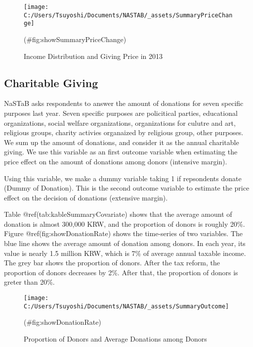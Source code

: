 \documentclass[
]{article}
\begin{document}
\begin{figure}[t]

{\centering \texttt{[image: C:/Users/Tsuyoshi/Documents/NASTAB/\_assets/SummaryPriceChange]} 

}

\caption{Income Distribution and Giving Price in 2013}(\#fig:showSummaryPriceChange)
\end{figure}

\hypertarget{charitable-giving}{%
\subsection{Charitable Giving}\label{charitable-giving}}

NaSTaB asks respondents to answer the amount of donations for seven specific purposes last year.
Seven specific purposes are
policitical parties,
educational organizations,
social welfare organizations,
organizations for culutre and art,
religious groups,
charity activies organaized by religious group,
other purposes.
We sum up the amount of donations, and consider it as the annual charitable giving.
We use this variable as an first outcome variable when
estimating the price effect on the amount of donations among donors (intensive margin).

Using this variable, we make a dummy variable taking 1 if repsondents donate (Dummy of Donation).
This is the second outcome variable
to estimate the price effect on the decision of donations (extensive margin).

Table @ref(tab:kableSummaryCovariate) shows that
the average amount of donation is almost 300,000 KRW,
and the proportion of donors is roughly 20\%.
Figure @ref(fig:showDonationRate) shows the time-series of two variables.
The blue line shows the average amount of donation among donors.
In each year, its value is nearly 1.5 million KRW,
which is 7\% of average annual taxable income.
The grey bar shows the proportion of donors.
After the tax reform, the proportion of donors decreases by 2\%.
After that, the proportion of donors is greter than 20\%.
\color{black}

\begin{figure}[t]

{\centering \texttt{[image: C:/Users/Tsuyoshi/Documents/NASTAB/\_assets/SummaryOutcome]} 

}

\caption{Proportion of Donors and Average Donations among Donors}(\#fig:showDonationRate)
\end{figure}
\end{document}
